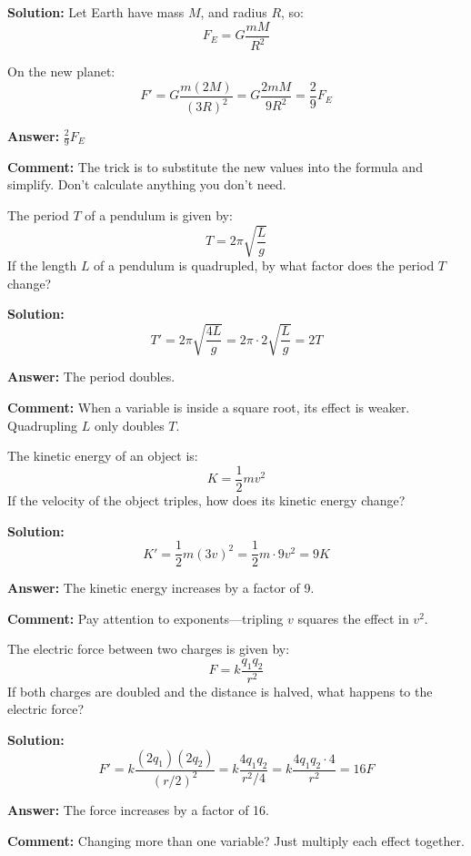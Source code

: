 \textbf{Solution:} Let Earth have mass \( M \), and radius \( R \), so:
\[
F_E = G \frac{m M}{R^2}
\]

On the new planet:
\[
F' = G \frac{m (2M)}{(3R)^2} = G \frac{2mM}{9R^2} = \frac{2}{9} F_E
\]

\textbf{Answer:} \( \frac{2}{9} F_E \)

\textbf{Comment:} The trick is to substitute the new values into the formula and simplify. Don’t calculate anything you don’t need.

\vspace{1em}

	The period \( T \) of a pendulum is given by:
	\[
	T = 2\pi \sqrt{\frac{L}{g}}
	\]
	If the length \( L \) of a pendulum is quadrupled, by what factor does the period \( T \) change?


\textbf{Solution:}
\[
T' = 2\pi \sqrt{\frac{4L}{g}} = 2\pi \cdot 2\sqrt{\frac{L}{g}} = 2T
\]

\textbf{Answer:} The period doubles.

\textbf{Comment:} When a variable is inside a square root, its effect is weaker. Quadrupling \( L \) only doubles \( T \).

\vspace{1em}

	The kinetic energy of an object is:
	\[
	K = \frac{1}{2}mv^2
	\]
	If the velocity of the object triples, how does its kinetic energy change?


\textbf{Solution:}
\[
K' = \frac{1}{2} m (3v)^2 = \frac{1}{2} m \cdot 9v^2 = 9K
\]

\textbf{Answer:} The kinetic energy increases by a factor of 9.

\textbf{Comment:} Pay attention to exponents—tripling \( v \) squares the effect in \( v^2 \).

\vspace{1em}

	The electric force between two charges is given by:
	\[
	F = k \frac{q_1 q_2}{r^2}
	\]
	If both charges are doubled and the distance is halved, what happens to the electric force?


\textbf{Solution:}
\[
F' = k \frac{(2q_1)(2q_2)}{(r/2)^2} = k \frac{4q_1 q_2}{r^2/4} = k \frac{4q_1 q_2 \cdot 4}{r^2} = 16F
\]

\textbf{Answer:} The force increases by a factor of 16.

\textbf{Comment:} Changing more than one variable? Just multiply each effect together.

\vspace{1em}

